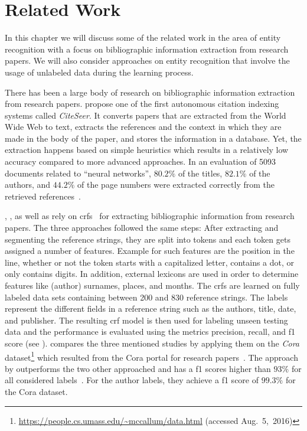 \chapter{Related Work}\label{cha:related-work}
In this chapter we will discuss some of the related work in the area of entity recognition with a focus on bibliographic information extraction from research papers.
We will also consider approaches on entity recognition that involve the usage of unlabeled data during the learning process.

\bigskip

There has been a large body of research on bibliographic information extraction from research papers.
\citet{giles1998citeseer} propose one of the first autonomous citation indexing systems called \emph{CiteSeer}.
It converts papers that are extracted from the World Wide Web to text, extracts the references and the context in which they are made in the body of the paper, and stores the information in a database.
Yet, the extraction happens based on simple heuristics which results in a relatively low accuracy compared to more advanced approaches.
In an evaluation of \num{5093} documents related to ``neural networks'', $80.2\%$ of the titles, $82.1\%$ of the authors, and $44.2\%$ of the page numbers were extracted correctly from the retrieved references~\cite{giles1998citeseer}.


\citet{peng2004accurate}, \citet{councill2008parscit}, as well as \citet{groza2012reference} rely on \glspl{crf}~\citep{lafferty2001conditional} for extracting bibliographic information from research papers.
The three approaches followed the same steps:
After extracting and segmenting the reference strings, they are split into tokens and each token gets assigned a number of features.
Example for such features are the position in the line, whether or not the token starts with a capitalized letter, contains a dot, or only contains digits.
In addition, external lexicons are used in order to determine features like (author) surnames, places, and months.
The \glspl{crf} are learned on fully labeled data sets containing between 200 and 830 reference strings.
The labels represent the different fields in a reference string such as the authors, title, date, and publisher.
The resulting \gls{crf} model is then used for labeling unseen testing data and the performance is evaluated using the metrics \gls{precision}, \gls{recall}, and \gls{f1 score} (see ).
\citet{groza2012reference} compares the three mentioned studies by applying them on the \textit{Cora} dataset\footnote{\url{https://people.cs.umass.edu/~mccallum/data.html} (accessed Aug.~5,~2016)} which resulted from the Cora portal for research papers~\citep{mccallum2000automating}.
The approach by \citet{groza2012reference} outperforms the two other approached and has a \glspl{f1 score} higher than $93\%$ for all considered labels~\citep{groza2012reference}.
For the author labels, they achieve a \gls{f1 score} of $99.3\%$ for the Cora dataset.

